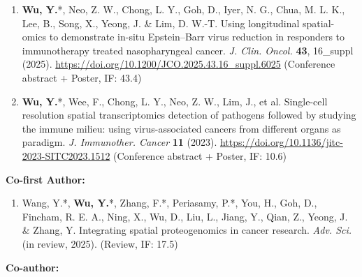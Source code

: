 \documentclass[11pt,a4paper]{article}
\newcommand{\urltext}[1]{\href{#1}{#1}}
\begin{document}
\begin{enumerate}[leftmargin=*,nosep]
\item \textbf{Wu, Y.}*, Neo, Z. W., Chong, L. Y., Goh, D., Iyer, N. G., Chua, M. L. K., Lee, B., Song, X., Yeong, J. \& Lim, D. W.-T. Using longitudinal spatial-omics to demonstrate in-situ Epstein--Barr virus reduction in responders to immunotherapy treated nasopharyngeal cancer. \textit{J. Clin. Oncol.} \textbf{43}, 16\_suppl (2025). \urltext{https://doi.org/10.1200/JCO.2025.43.16\_suppl.6025} (Conference abstract + Poster, IF: 43.4)

\item \textbf{Wu, Y.}*, Wee, F., Chong, L. Y., Neo, Z. W., Lim, J., et al. Single-cell resolution spatial transcriptomics detection of pathogens followed by studying the immune milieu: using virus-associated cancers from different organs as paradigm. \textit{J. Immunother. Cancer} \textbf{11} (2023). \urltext{https://doi.org/10.1136/jitc-2023-SITC2023.1512} (Conference abstract + Poster, IF: 10.6)
\end{enumerate}

\textbf{Co-first Author:}

\begin{enumerate}[leftmargin=*,nosep,resume]
\item Wang, Y.*, \textbf{Wu, Y.}*, Zhang, F.*, Periasamy, P.*, You, H., Goh, D., Fincham, R. E. A., Ning, X., Wu, D., Liu, L., Jiang, Y., Qian, Z., Yeong, J. \& Zhang, Y. Integrating spatial proteogenomics in cancer research. \textit{Adv. Sci.} (in review, 2025). (Review, IF: 17.5)
\end{enumerate}

\textbf{Co-author:}
\end{document}
